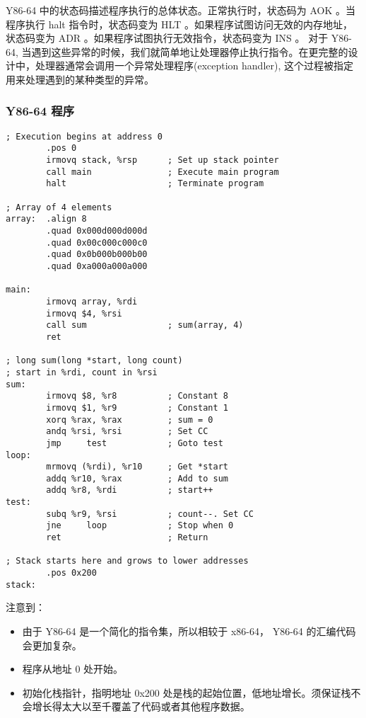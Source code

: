 Y86-64 中的状态码描述程序执行的总体状态。正常执行时，状态码为 AOK 。当程序执行 halt 指令时，状态码变为 HLT 。如果程序试图访问无效的内存地址，状态码变为 ADR 。如果程序试图执行无效指令，状态码变为 INS 。
对于 Y86-64, 当遇到这些异常的时候，我们就简单地让处理器停止执行指令。在更完整的设计中，处理器通常会调用一个异常处理程序(exception handler), 这个过程被指定用来处理遇到的某种类型的异常。

\subsubsection{Y86-64 程序}
\begin{lstlisting}[style=ASMStyle]
; Execution begins at address 0
        .pos 0
        irmovq stack, %rsp      ; Set up stack pointer
        call main               ; Execute main program
        halt                    ; Terminate program

; Array of 4 elements
array:  .align 8
        .quad 0x000d000d000d
        .quad 0x00c000c000c0
        .quad 0x0b000b000b00
        .quad 0xa000a000a000

main:
        irmovq array, %rdi
        irmovq $4, %rsi
        call sum                ; sum(array, 4)
        ret

; long sum(long *start, long count)
; start in %rdi, count in %rsi
sum:
        irmovq $8, %r8          ; Constant 8
        irmovq $1, %r9          ; Constant 1
        xorq %rax, %rax         ; sum = 0
        andq %rsi, %rsi         ; Set CC
        jmp     test            ; Goto test
loop:
        mrmovq (%rdi), %r10     ; Get *start
        addq %r10, %rax         ; Add to sum
        addq %r8, %rdi          ; start++
test:
        subq %r9, %rsi          ; count--. Set CC
        jne     loop            ; Stop when 0
        ret                     ; Return

; Stack starts here and grows to lower addresses
        .pos 0x200
stack:
\end{lstlisting}

注意到：
\begin{itemize}
    \item 由于 Y86-64 是一个简化的指令集，所以相较于 x86-64， Y86-64 的汇编代码会更加复杂。
    \item 程序从地址 0 处开始。
    \item 初始化栈指针，指明地址 0x200 处是栈的起始位置，低地址增长。须保证栈不会增长得太大以至千覆盖了代码或者其他程序数据。
\end{itemize}

